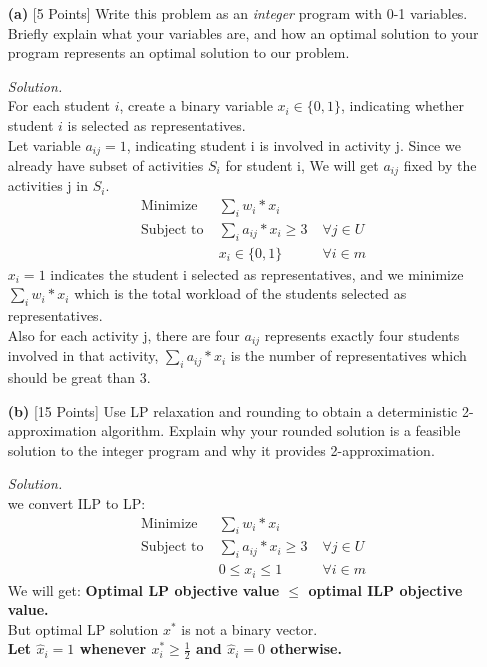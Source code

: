 \documentclass[10pt]{article}
\begin{document}
\begin{enumerate}
    \item[\textbf{(a)}] {[5 Points]} Write this problem as an \textit{integer} program with 0-1 variables. Briefly explain what your variables are, and how an optimal solution to your program represents an optimal solution to our problem.
    \begin{mdframed}
        \textit{Solution.}\\
        For each student $i$, create a binary variable $x_i \in \{0,1\}$, indicating whether student $i$ is selected as representatives.\\
        Let variable $a_{ij} = 1$, indicating student i is involved in activity j. Since we already have subset of activities $S_i$ for student i, We will get $a_{ij}$ fixed by the activities j in $S_i$.
        \begin{align*}
            &\text{Minimize} \; &\sum_i w_i*x_i\\
            &\text{Subject to} \; &\sum_i a_{ij} * x_i \geq 3  \; &\forall j \in U\\
            && x_i \in \{0, 1\} \; &\forall i \in m
        \end{align*}
        $x_i = 1$ indicates the student i selected as representatives, and we minimize $\sum_i w_i*x_i$ which is the total workload of the students selected as representatives.\\
        Also for each activity j, there are four $a_{ij}$ represents exactly four students involved in that activity, $\sum_i a_{ij}*x_i$ is the number of representatives which should be great than 3.
    \end{mdframed}
    \item[\textbf{(b)}] {[15 Points]} Use LP relaxation and rounding to obtain a deterministic 2-approximation algorithm. Explain why your rounded solution is a feasible solution to the integer program and why it provides 2-approximation.
    \begin{mdframed}
        \textit{Solution.}\\ we convert ILP to LP:
        \begin{align*}
            &\text{Minimize} \; &\sum_i w_i*x_i\\
            &\text{Subject to} \; &\sum_i a_{ij} * x_i \geq 3  \; &\forall j \in U\\
            && 0 \leq x_i \leq 1 \; &\forall i \in m
        \end{align*}
        We will get: \textbf{Optimal LP objective value $\leq$ optimal ILP objective value.}\\ But optimal LP solution $x^*$ is not a binary vector.\\
        \textbf{Let $\hat x_i = 1$ whenever $x_i^* \geq \frac{1}{2}$ and $\hat x_i = 0$ otherwise.}
        

\end{mdframed}
\end{enumerate}
\end{document}
